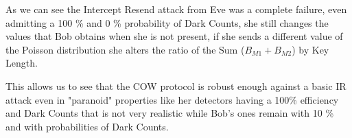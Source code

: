 \begin{refsection}
As we can see the Intercept Resend attack from Eve was a complete failure, even admitting a 100 \% and 0 \% probability of Dark Counts, she still changes the values that Bob obtains when she is not present, if she sends a different value of the Poisson distribution she alters the ratio of the Sum ($B_{M1}+B_{M2}$) by Key Length.

This allows us to see that the COW protocol is robust enough against a basic IR attack even in "paranoid" properties like her detectors having a 100\% efficiency and Dark Counts that is not very realistic while Bob's ones remain with 10 \% and with probabilities of Dark Counts.


\clearpage
\printbibliography[heading=subbibliography]
\end{refsection}
\cleardoublepage
